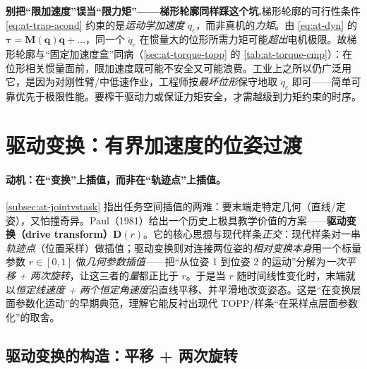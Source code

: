 \begin{pitfall}
\textbf{别把“限加速度”误当“限力矩”——梯形轮廓同样踩这个坑.}\;梯形轮廓的可行性条件 \cref{eq:at-trap-acond} 约束的是\emph{运动学加速度} $\ddot q_c$，而非真机的\emph{力矩}。由 \cref{eq:at-dyn} 的 $\boldsymbol\tau=\mathbf M(\mathbf q)\ddot{\mathbf q}+\dots$，同一个 $\ddot q_c$ 在惯量大的位形所需力矩可能\emph{超出}电机极限。故梯形轮廓与“固定加速度盒”同病（\cref{sec:at-torque-topp} 的 \cref{tab:at-torque-cmp}）：在位形相关惯量面前，限加速度既可能不安全又可能浪费。工业上之所以仍广泛用它，是因为对刚性臂/中低速作业，工程师按\emph{最坏位形}保守地取 $\ddot q_c$ 即可——简单可靠优先于极限性能。要榨干驱动力或保证力矩安全，才需越级到力矩约束的时序。
\end{pitfall}

\section{驱动变换：有界加速度的位姿过渡}
\label{sec:at-drive-transform}

\paragraph{动机：在“变换”上插值，而非在“轨迹点”上插值。}
\cref{subsec:at-jointvstask} 指出任务空间插值的两难：要末端走特定几何（直线/定姿），又怕撞奇异。Paul（1981）给出一个历史上极具教学价值的方案——\textbf{驱动变换（drive transform）}$\mathbf D(r)$\cite{paul1981robot}。它的核心思想与现代样条\emph{正交}：现代样条对一串\emph{轨迹点}（位置采样）做插值；驱动变换则对连接两位姿的\emph{相对变换本身}用一个标量参数 $r\in[0,1]$ 做\emph{几何参数插值}——把“从位姿 1 到位姿 2 的运动”分解为\emph{一次平移 + 两次旋转}，让这三者的\emph{量}都正比于 $r$。于是当 $r$ 随时间线性变化时，末端就以\emph{恒定线速度 + 两个恒定角速度}沿直线平移、并平滑地改变姿态。这是“在变换层面参数化运动”的早期典范，理解它能反衬出现代 TOPP/样条“在采样点层面参数化”的取舍。

\subsection{驱动变换的构造：平移 + 两次旋转}
\label{subsec:at-dt-build}

